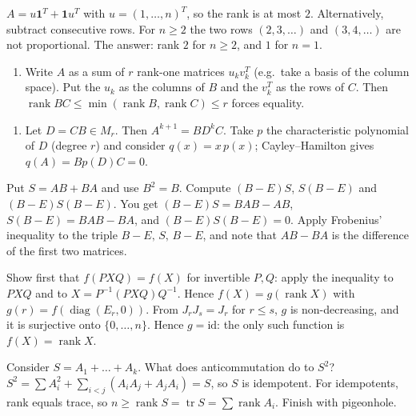 \documentclass[11pt,a4paper]{article}
\begin{document}
\(A=u\mathbf 1^T+\mathbf 1u^T\) with \(u=(1,\dots,n)^T\), so the rank is at most \(2\). Alternatively, subtract consecutive rows.
For \(n\ge2\) the two rows \((2,3,\dots)\) and \((3,4,\dots)\) are not proportional. The answer: rank \(2\) for \(n\ge2\), and \(1\) for \(n=1\).

\begin{enumerate}
\def\labelenumi{(\alph{enumi})}
\tightlist
\item
  Write \(A\) as a sum of \(r\) rank-one matrices \(u_kv_k^T\) (e.g.~take a basis of the column space). Put the \(u_k\) as the columns of \(B\) and the \(v_k^T\) as the rows of \(C\). Then \(\operatorname{rank}BC\le\min(\operatorname{rank}B,\operatorname{rank}C)\le r\) forces equality.
\end{enumerate}
\begin{enumerate}
\def\labelenumi{(\alph{enumi})}
\setcounter{enumi}{1}
\tightlist
\item
  Let \(D=CB\in M_r\). Then \(A^{k+1}=BD^kC\). Take \(p\) the characteristic polynomial of \(D\) (degree \(r\)) and consider \(q(x)=x\,p(x)\); Cayley--Hamilton gives \(q(A)=Bp(D)C=0\).
\end{enumerate}

Put \(S=AB+BA\) and use \(B^2=B\). Compute \((B-E)S\), \(S(B-E)\) and \((B-E)S(B-E)\).
You get \((B-E)S=BAB-AB\), \(S(B-E)=BAB-BA\), and \((B-E)S(B-E)=0\). Apply Frobenius' inequality to the triple \(B-E,\,S,\,B-E\), and note that \(AB-BA\) is the difference of the first two matrices.

Show first that \(f(PXQ)=f(X)\) for invertible \(P,Q\): apply the inequality to \(PXQ\) and to \(X=P^{-1}(PXQ)Q^{-1}\).
Hence \(f(X)=g(\operatorname{rank}X)\) with \(g(r)=f(\operatorname{diag}(E_r,0))\). From \(J_rJ_s=J_r\) for \(r\le s\), \(g\) is non-decreasing, and it is surjective onto \(\{0,\dots,n\}\). Hence \(g=\mathrm{id}\): the only such function is \(f(X)=\operatorname{rank}X\).

Consider \(S=A_1+\dots+A_k\). What does anticommutation do to \(S^2\)?
\(S^2=\sum A_i^2+\sum_{i\lt j}(A_iA_j+A_jA_i)=S\), so \(S\) is idempotent. For idempotents, rank equals trace, so \(n\ge\operatorname{rank}S=\operatorname{tr}S=\sum\operatorname{rank}A_i\). Finish with pigeonhole.
\end{document}
